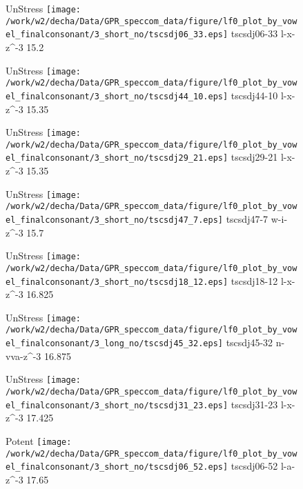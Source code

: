 \documentclass{article}
\begin{document}
\begin{figure}[t]
\begin{minipage}[b]{.24\textwidth}
UnStress
\centering
\texttt{[image: /work/w2/decha/Data/GPR\_speccom\_data/figure/lf0\_plot\_by\_vowel\_finalconsonant/3\_short\_no/tscsdj06\_33.eps]}
tscsdj06-33 l-x-z\textasciicircum-3 15.2
\end{minipage}
\begin{minipage}[b]{.24\textwidth}
UnStress
\centering
\texttt{[image: /work/w2/decha/Data/GPR\_speccom\_data/figure/lf0\_plot\_by\_vowel\_finalconsonant/3\_short\_no/tscsdj44\_10.eps]}
tscsdj44-10 l-x-z\textasciicircum-3 15.35
\end{minipage}
\begin{minipage}[b]{.24\textwidth}
UnStress
\centering
\texttt{[image: /work/w2/decha/Data/GPR\_speccom\_data/figure/lf0\_plot\_by\_vowel\_finalconsonant/3\_short\_no/tscsdj29\_21.eps]}
tscsdj29-21 l-x-z\textasciicircum-3 15.35
\end{minipage}
\begin{minipage}[b]{.24\textwidth}
UnStress
\centering
\texttt{[image: /work/w2/decha/Data/GPR\_speccom\_data/figure/lf0\_plot\_by\_vowel\_finalconsonant/3\_short\_no/tscsdj47\_7.eps]}
tscsdj47-7 w-i-z\textasciicircum-3 15.7
\end{minipage}
\end{figure}

\begin{figure}[t]
\begin{minipage}[b]{.24\textwidth}
UnStress
\centering
\texttt{[image: /work/w2/decha/Data/GPR\_speccom\_data/figure/lf0\_plot\_by\_vowel\_finalconsonant/3\_short\_no/tscsdj18\_12.eps]}
tscsdj18-12 l-x-z\textasciicircum-3 16.825
\end{minipage}
\begin{minipage}[b]{.24\textwidth}
UnStress
\centering
\texttt{[image: /work/w2/decha/Data/GPR\_speccom\_data/figure/lf0\_plot\_by\_vowel\_finalconsonant/3\_long\_no/tscsdj45\_32.eps]}
tscsdj45-32 n-vva-z\textasciicircum-3 16.875
\end{minipage}
\begin{minipage}[b]{.24\textwidth}
UnStress
\centering
\texttt{[image: /work/w2/decha/Data/GPR\_speccom\_data/figure/lf0\_plot\_by\_vowel\_finalconsonant/3\_short\_no/tscsdj31\_23.eps]}
tscsdj31-23 l-x-z\textasciicircum-3 17.425
\end{minipage}
\begin{minipage}[b]{.24\textwidth}
\colorbox{Apricot}{Potent}
\centering
\texttt{[image: /work/w2/decha/Data/GPR\_speccom\_data/figure/lf0\_plot\_by\_vowel\_finalconsonant/3\_short\_no/tscsdj06\_52.eps]}
tscsdj06-52 l-a-z\textasciicircum-3 17.65
\end{minipage}
\end{figure}
\end{document}

